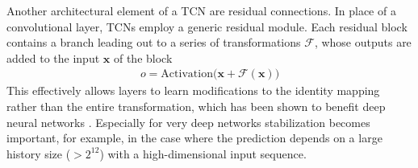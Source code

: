 \documentclass{scrartcl}
\begin{document}
Another architectural element of a TCN are residual connections. In place of a convolutional layer, TCNs employ a generic residual module. Each residual block contains a branch leading out to a series of transformations $\mathcal F$, whose outputs are added to the input $\mathbf x$ of the block 
\begin{align}
o = \text{Activation} \big(\mathbf x + \mathcal F(\mathbf x)\big)
\end{align}
This effectively allows layers to learn modifications to the identity mapping rather than the entire transformation, which has been shown to benefit deep neural networks \cite{He2016}. Especially for very deep networks stabilization becomes important, for example, in the case where the prediction depends on a large history size ($> 2^{12}$) with a high-dimensional input sequence. 
\end{document}
